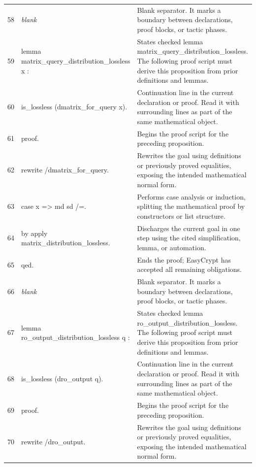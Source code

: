 \documentclass[10pt]{article}
\begin{document}
\begin{longtable}{r L{0.53\textwidth} L{0.37\textwidth}}
58 & {\ttfamily\scriptsize \emph{blank}} & Blank separator.  It marks a boundary between declarations, proof blocks, or tactic phases. \\
59 & {\ttfamily\scriptsize lemma matrix\_query\_distribution\_lossless x :} & States checked lemma matrix\_query\_distribution\_lossless.  The following proof script must derive this proposition from prior definitions and lemmas. \\
60 & {\ttfamily\scriptsize   is\_lossless (dmatrix\_for\_query x).} & Continuation line in the current declaration or proof.  Read it with surrounding lines as part of the same mathematical object. \\
61 & {\ttfamily\scriptsize proof.} & Begins the proof script for the preceding proposition. \\
62 & {\ttfamily\scriptsize rewrite /dmatrix\_for\_query.} & Rewrites the goal using definitions or previously proved equalities, exposing the intended mathematical normal form. \\
63 & {\ttfamily\scriptsize case x => md sd /=.} & Performs case analysis or induction, splitting the mathematical proof by constructors or list structure. \\
64 & {\ttfamily\scriptsize by apply matrix\_distribution\_lossless.} & Discharges the current goal in one step using the cited simplification, lemma, or automation. \\
65 & {\ttfamily\scriptsize qed.} & Ends the proof; EasyCrypt has accepted all remaining obligations. \\
66 & {\ttfamily\scriptsize \emph{blank}} & Blank separator.  It marks a boundary between declarations, proof blocks, or tactic phases. \\
67 & {\ttfamily\scriptsize lemma ro\_output\_distribution\_lossless q :} & States checked lemma ro\_output\_distribution\_lossless.  The following proof script must derive this proposition from prior definitions and lemmas. \\
68 & {\ttfamily\scriptsize   is\_lossless (dro\_output q).} & Continuation line in the current declaration or proof.  Read it with surrounding lines as part of the same mathematical object. \\
69 & {\ttfamily\scriptsize proof.} & Begins the proof script for the preceding proposition. \\
70 & {\ttfamily\scriptsize rewrite /dro\_output.} & Rewrites the goal using definitions or previously proved equalities, exposing the intended mathematical normal form. \\

\end{longtable}
\end{document}

